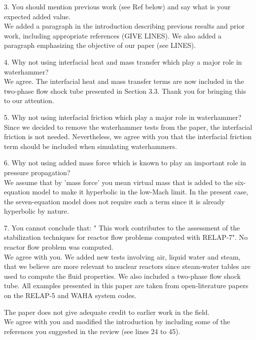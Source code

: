 \documentclass{article}
\newcommand{\tcr}[1]{\textcolor{red}{#1}}
\begin{document}
{\color{blue}
3. You should mention previous work (see Ref below) and say what is your expected added value. \\
}
We added a paragraph in the introduction describing previous results and prior work, including  appropriate references (GIVE LINES). We also added a paragraph emphasizing the objective of our paper (see LINES).

\bigskip

{\color{blue}
4. Why not using interfacial heat and mass transfer which play a major role in waterhammer? \\
}
We agree. The interfacial heat and mass transfer terms are now included in the two-phase flow shock tube presented in Section 3.3. Thank you for bringing this to our attention.
\bigskip

{\color{blue}
5. Why not using interfacial friction which play a major role in waterhammer? \\
}
Since we decided to remove the waterhammer tests from the paper, the interfacial friction is not needed. Nevertheless, we agree with you that the interfacial friction term should be included when simulating waterhammers.
\bigskip

{\color{blue}
6. Why not using added mass force which is known to play an important role in pressure propagation? \\
}
We assume that by 'mass force' you mean virtual mass that is added to the six-equation model to make it hyperbolic in the low-Mach limit. In the present case, the seven-equation model does not require such a term since it is already hyperbolic by nature.
\bigskip

{\color{blue}
7. You cannot conclude that: " This work contributes to the assessment of the stabilization techniques for reactor flow problems computed with RELAP-7". No reactor flow problem was computed. \\
}
We agree with you. We added new tests involving air, liquid water and steam, that we believe are more relevant to nuclear reactors since steam-water tables are used to compute the fluid properties. We also included a two-phase flow shock tube. All examples presented in this paper are taken from open-literature papers on the RELAP-5 and WAHA system codes. 
\bigskip

{\color{blue}
The paper does not give adequate credit to earlier work in the field. \\
}
We agree with you and modified the introduction by including some of the references you suggested in the review (see lines 24 to 45).
\end{document}
